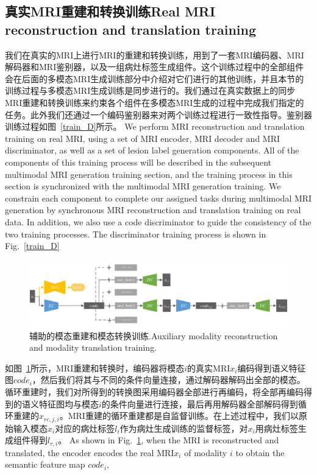 \documentclass[letterpaper]{article} %
\begin{document}
\subsection{真实MRI重建和转换训练Real MRI reconstruction and translation training}
我们在真实的MRI上进行MRI的重建和转换训练，用到了一套MRI编码器、MRI解码器和MRI鉴别器，以及一组病灶标签生成组件。这个训练过程中的全部组件会在后面的多模态MRI生成训练部分中介绍对它们进行的其他训练，并且本节的训练过程与多模态MRI生成训练是同步进行的。我们通过在真实数据上的同步MRI重建和转换训练来约束各个组件在多模态MRI生成的过程中完成我们指定的任务。此外我们还通过一个编码鉴别器来对两个训练过程进行一致性指导。鉴别器训练过程如图~\ref{train_D}所示。
We perform MRI reconstruction and translation training on real MRI, using a set of MRI encoder, MRI decoder and MRI discriminator, as well as a set of lesion label generation components. All of the components of this training process will be described in the subsequent multimodal MRI generation training section, and the training process in this section is synchronized with the multimodal MRI generation training. We constrain each component to complete our assigned tasks during multimodal MRI generation by synchronous MRI reconstruction and translation training on real data. In addition, we also use a code discriminator to guide the consistency of the two training processes. The discriminator training process is shown in Fig.~\ref{train_D}

\begin{figure}
	\centering
	\includegraphics[width=0.98\columnwidth]{figures/trans_train}
	\caption{辅助的模态重建和模态转换训练.Auxiliary modality reconstruction and modality translation training.}
	\label{trans_train}
\end{figure}

如图~\ref{trans_train}所示，MRI重建和转换时，编码器将模态$i$的真实MRI$x_i$编码得到语义特征图$code_{i}$，然后我们将其与不同的条件向量连接，通过解码器解码出全部的模态。循环重建时，我们对所得到的转换图采用编码器全部进行再编码，将全部再编码得到的语义特征图均与模态$i$的条件向量进行连接，最后再用解码器全部解码得到循环重建的$x_{rc,j,i}$。MRI重建的循环重建都是自监督训练。在上述过程中，我们以原始输入模态$x_i$对应的病灶标签$l_i$作为病灶生成训练的监督标签，对$x_i$用病灶标签生成组件得到$l_{r,i}$。
As shown in Fig.~\ref{trans_train}, when the MRI is reconstructed and translated, the encoder encodes the real MRI$x_i$ of modality $i$ to obtain the semantic feature map $code_{i}$, 
\end{document}
